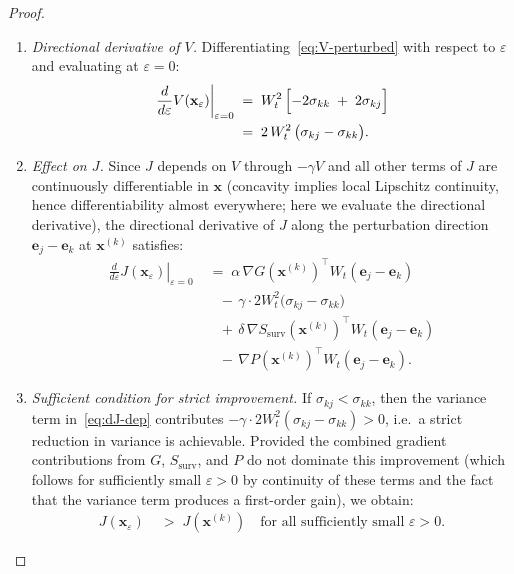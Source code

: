 \documentclass[12pt,openany]{book}
\newcommand{\bfx}{\mathbf{x}}
\numberwithin{equation}{chapter}
\theoremstyle{plain}
\theoremstyle{definition}
\theoremstyle{remark}
\numberwithin{equation}{chapter}
\theoremstyle{plain}
\newcommand{\bfe}{\mathbf{e}}
\begin{document}
\begin{proof}
\begin{enumerate}
\begin{enumerate}
  \item[\textup{(5d)}] \textit{Directional derivative of $V$.}
        Differentiating~\eqref{eq:V-perturbed} with respect to
        $\varepsilon$ and evaluating at $\varepsilon = 0$:
        \begin{align}
          \left.\frac{d}{d\varepsilon} V(\bfx_\varepsilon)
          \right|_{\varepsilon=0}
            &\;=\; W_t^2\,\Bigl[
                   -2\sigma_{kk} \;+\; 2\sigma_{kj}
                   \Bigr]
          \nonumber\\
            &\;=\; 2\,W_t^2\,\bigl(\sigma_{kj} - \sigma_{kk}\bigr).
          \label{eq:dV-dep}
        \end{align}

  \item[\textup{(5e)}] \textit{Effect on $J$.}
        Since $J$ depends on $V$ through $-\gamma V$ and all other
        terms of $J$ are continuously differentiable in $\bfx$
        (concavity implies local Lipschitz continuity, hence
        differentiability almost everywhere; here we evaluate the
        directional derivative), the directional derivative of
        $J$ along the perturbation direction $\bfe_j - \bfe_k$
        at $\bfx^{(k)}$ satisfies:
        \begin{align}
          \left.\frac{d}{d\varepsilon} J(\bfx_\varepsilon)
          \right|_{\varepsilon=0}
            &\;=\; \alpha\,\nabla G(\bfx^{(k)})^\top
                   W_t(\bfe_j-\bfe_k)
            \nonumber\\
            &\quad -\,\gamma \cdot 2 W_t^2
                   \bigl(\sigma_{kj}-\sigma_{kk}\bigr)
            \nonumber\\
            &\quad +\,\delta\,
                   \nabla S_{\mathrm{surv}}(\bfx^{(k)})^\top
                   W_t(\bfe_j-\bfe_k)
            \nonumber\\
            &\quad -\,\nabla P(\bfx^{(k)})^\top
                   W_t(\bfe_j-\bfe_k).
          \label{eq:dJ-dep}
        \end{align}

  \item[\textup{(5f)}] \textit{Sufficient condition for strict
        improvement.}
        If $\sigma_{kj} < \sigma_{kk}$, then the variance term
        in~\eqref{eq:dJ-dep} contributes
        $-\gamma \cdot 2 W_t^2(\sigma_{kj}-\sigma_{kk}) > 0$,
        i.e.\ a strict reduction in variance is achievable.
        Provided the combined gradient contributions from $G$,
        $S_{\mathrm{surv}}$, and $P$ do not dominate this
        improvement (which follows for sufficiently small
        $\varepsilon > 0$ by continuity of these terms and the
        fact that the variance term produces a first-order gain),
        we obtain:
        \begin{align}
          J(\bfx_\varepsilon) &\;>\; J(\bfx^{(k)})
          \quad \text{for all sufficiently small } \varepsilon > 0.
          \label{eq:strict-improvement}
        \end{align}


\end{enumerate}
\end{enumerate}
\end{proof}
\end{document}

